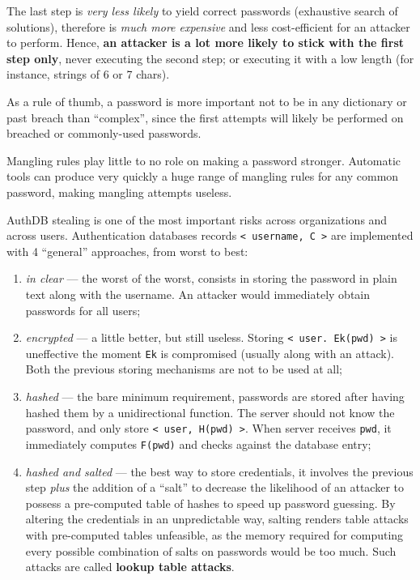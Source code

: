 \documentclass[10pt]{\classname}
\begin{document}
The last step is \emph{very less likely} to yield correct passwords (exhaustive
search of solutions), therefore is \emph{much more expensive} and less
cost\--efficient for an attacker to perform. Hence, \textbf{an attacker is a
lot more likely to stick with the first step only}, never executing the second
step; or executing it with a low length (for instance, strings of 6 or 7
chars).

As a rule of thumb, a password is more important not to be in any dictionary or
past breach than ``complex'', since the first attempts will likely be performed
on breached or commonly\--used passwords.

Mangling rules play little to no role on making a password stronger. Automatic
tools can produce very quickly a huge range of mangling rules for any common
password, making mangling attempts useless.

AuthDB stealing is one of the most important risks across organizations and
across users. Authentication databases records \texttt{< username, C >} are
implemented with 4 ``general'' approaches, from worst to best:
\begin{enumerate}
    \item \emph{in clear} --- the worst of the worst, consists in storing the
        password in plain text along with the username. An attacker would
        immediately obtain passwords for all users;
    \item \emph{encrypted} --- a little better, but still useless. Storing
        \texttt{< user. Ek(pwd) >} is uneffective the moment \texttt{Ek} is
        compromised (usually along with an attack). Both the previous storing
        mechanisms are not to be used at all;
    \item \emph{hashed} --- the bare minimum requirement, passwords are stored
        after having hashed them by a unidirectional function. The server
        should not know the password, and only store \texttt{< user, H(pwd) >}.
        When server receives \texttt{pwd}, it immediately computes
        \texttt{F(pwd)} and checks against the database entry;
    \item \emph{hashed and salted} --- the best way to store credentials, it
        involves the previous step \emph{plus} the addition of a ``salt'' to
        decrease the likelihood of an attacker to possess a pre\--computed
        table of hashes to speed up password guessing. By altering the
        credentials in an unpredictable way, salting renders table attacks with
        pre\--computed tables unfeasible, as the memory required for computing
        every possible combination of salts on passwords would be too much.
        Such attacks are called \textbf{lookup table attacks}.
\end{enumerate}
\end{document}
